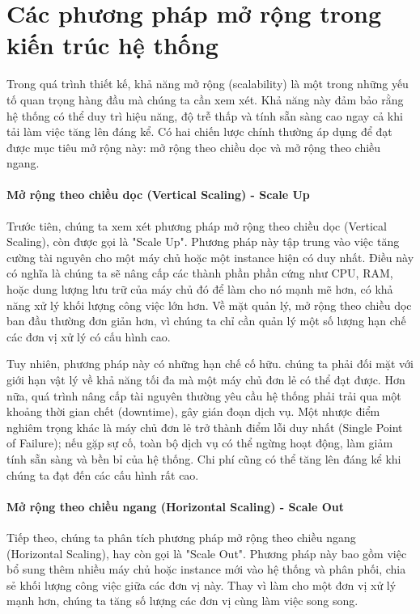 \section*{Các phương pháp mở rộng trong kiến trúc hệ thống}
\label{sec:scaling_comparison} %

Trong quá trình thiết kế, khả năng mở rộng (scalability) là một trong những yếu tố quan trọng hàng đầu mà chúng ta cần xem xét. Khả năng này đảm bảo rằng hệ thống có thể duy trì hiệu năng, độ trễ thấp và tính sẵn sàng cao ngay cả khi tải làm việc tăng lên đáng kể. Có hai chiến lược chính thường áp dụng để đạt được mục tiêu mở rộng này: mở rộng theo chiều dọc và mở rộng theo chiều ngang.

\paragraph{Mở rộng theo chiều dọc (Vertical Scaling) - Scale Up}

Trước tiên, chúng ta xem xét phương pháp mở rộng theo chiều dọc (Vertical Scaling), còn được gọi là "Scale Up". Phương pháp này tập trung vào việc tăng cường tài nguyên cho một máy chủ hoặc một instance hiện có duy nhất. Điều này có nghĩa là chúng ta sẽ nâng cấp các thành phần phần cứng như CPU, RAM, hoặc dung lượng lưu trữ của máy chủ đó để làm cho nó mạnh mẽ hơn, có khả năng xử lý khối lượng công việc lớn hơn. Về mặt quản lý, mở rộng theo chiều dọc ban đầu thường đơn giản hơn, vì chúng ta chỉ cần quản lý một số lượng hạn chế các đơn vị xử lý có cấu hình cao.

Tuy nhiên, phương pháp này có những hạn chế cố hữu. chúng ta phải đối mặt với giới hạn vật lý về khả năng tối đa mà một máy chủ đơn lẻ có thể đạt được. Hơn nữa, quá trình nâng cấp tài nguyên thường yêu cầu hệ thống phải trải qua một khoảng thời gian chết (downtime), gây gián đoạn dịch vụ. Một nhược điểm nghiêm trọng khác là máy chủ đơn lẻ trở thành điểm lỗi duy nhất (Single Point of Failure); nếu gặp sự cố, toàn bộ dịch vụ có thể ngừng hoạt động, làm giảm tính sẵn sàng và bền bỉ của hệ thống. Chi phí cũng có thể tăng lên đáng kể khi chúng ta đạt đến các cấu hình rất cao.

\paragraph{Mở rộng theo chiều ngang (Horizontal Scaling) - Scale Out}

Tiếp theo, chúng ta phân tích phương pháp mở rộng theo chiều ngang (Horizontal Scaling), hay còn gọi là "Scale Out". Phương pháp này bao gồm việc bổ sung thêm nhiều máy chủ hoặc instance mới vào hệ thống và phân phối, chia sẻ khối lượng công việc giữa các đơn vị này. Thay vì làm cho một đơn vị xử lý mạnh hơn, chúng ta tăng số lượng các đơn vị cùng làm việc song song.

